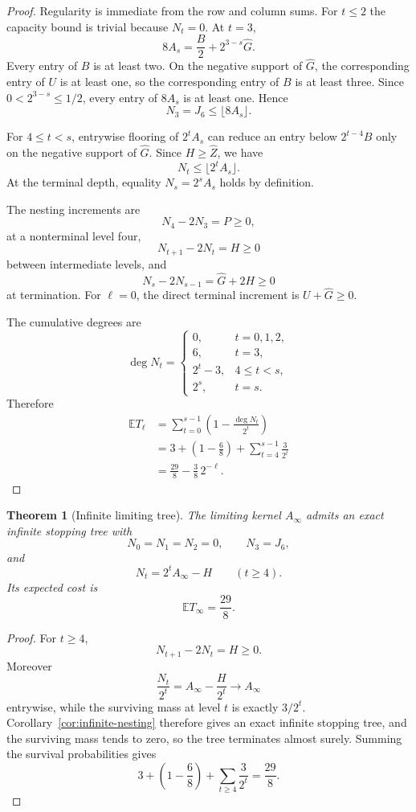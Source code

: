 \documentclass[11pt]{article}
\newtheorem{theorem}{Theorem}[section]
\theoremstyle{definition}
\newcommand{\degm}{\operatorname{deg}}
\begin{document}
\begin{proof}
Regularity is immediate from the row and column sums.
For $t\le2$ the capacity bound is trivial because $N_t=0$.
At $t=3$,
\[
8A_s=\frac{B}{2}+2^{3-s}\widehat G.
\]
Every entry of $B$ is at least two.  On the negative support of $\widehat G$, the corresponding
entry of $U$ is at least one, so the corresponding entry of $B$ is at least three.  Since
$0<2^{3-s}\le1/2$, every entry of $8A_s$ is at least one.  Hence
\[
N_3=J_6\le\lfloor8A_s\rfloor.
\]

For $4\le t<s$, entrywise flooring of $2^tA_s$ can reduce an entry below
$2^{t-4}B$ only on the negative support of $\widehat G$.
Since $H\ge\widehat Z$, we have
\[
N_t\le\lfloor2^tA_s\rfloor.
\]
At the terminal depth, equality $N_s=2^sA_s$ holds by definition.

The nesting increments are
\[
N_4-2N_3=P\ge0,
\]
at a nonterminal level four,
\[
N_{t+1}-2N_t=H\ge0
\]
between intermediate levels, and
\[
N_s-2N_{s-1}=\widehat G+2H\ge0
\]
at termination.  For $\ell=0$, the direct terminal increment is $U+\widehat G\ge0$.

The cumulative degrees are
\[
\degm N_t=
\begin{cases}
0,&t=0,1,2,\\
6,&t=3,\\
2^t-3,&4\le t<s,\\
2^s,&t=s.
\end{cases}
\]
Therefore
\[
\begin{aligned}
\mathbb E T_\ell
&=
\sum_{t=0}^{s-1}
\left(1-\frac{\degm N_t}{2^t}\right)\\
&=
3+\left(1-\frac68\right)+\sum_{t=4}^{s-1}\frac{3}{2^t}\\
&=
\frac{29}{8}-\frac38\,2^{-\ell}.
\end{aligned}
\]
\end{proof}

\begin{theorem}[Infinite limiting tree]
\label{thm:infinite-tree}
The limiting kernel $A_\infty$ admits an exact infinite stopping tree with
\[
N_0=N_1=N_2=0,\qquad N_3=J_6,
\]
and
\[
N_t=2^tA_\infty-H
\qquad(t\ge4).
\]
Its expected cost is
\[
\mathbb E T_\infty=\frac{29}{8}.
\]
\end{theorem}

\begin{proof}
For $t\ge4$,
\[
N_{t+1}-2N_t=H\ge0.
\]
Moreover
\[
\frac{N_t}{2^t}
=
A_\infty-\frac{H}{2^t}
\longrightarrow A_\infty
\]
entrywise, while the surviving mass at level $t$ is exactly $3/2^t$.
Corollary~\ref{cor:infinite-nesting} therefore gives an exact infinite stopping tree, and the
surviving mass tends to zero, so the tree terminates almost surely.
Summing the survival probabilities gives
\[
3+\left(1-\frac68\right)+\sum_{t\ge4}\frac{3}{2^t}
=
\frac{29}{8}.
\]
\end{proof}
\end{document}
